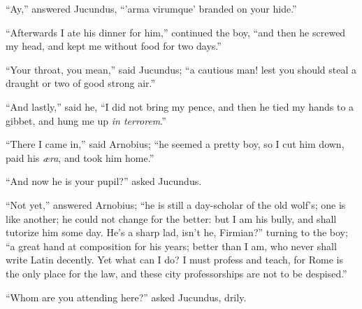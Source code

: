 ``Ay,'' answered Jucundus, ``'arma virumque' branded on
your hide.''

``Afterwards I ate his dinner for him,'' continued the boy,
``and then he screwed my head, and kept me without food for two
days.''

``Your throat, you mean,'' said Jucundus; ``a cautious
man! lest you should steal a draught or two of good strong air.''

``And lastly,'' said he, ``I did not bring my pence,
and then he tied my hands to a gibbet, and hung me up \emph{in
terrorem}.''

``There I came in,'' said Arnobius; ``he seemed a
pretty boy, so I cut him down, paid his \emph{æra}, and took him
home.''

``And now he is your pupil?'' asked Jucundus.

``Not yet,'' answered Arnobius; ``he is still a
day-scholar of the old wolf's; one is like another; he could not
change for the better: but I am his bully, and shall tutorize him some
day. He's a sharp lad, isn't he, Firmian?'' turning to the boy;
``a great hand at composition for his years; better than I am, who
never shall write Latin decently. Yet what can I do? I must profess
and teach, for Rome is the only place for the law, and these city
professorships are not to be despised.''

``Whom are you attending here?'' asked Jucundus, drily.

